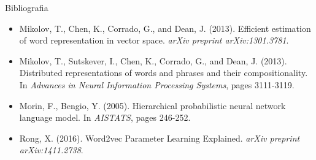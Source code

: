 \documentclass{beamer}
\begin{document}
\begin{frame}[fragile]{Bibliografia}

\begin{itemize}
\item Mikolov, T., Chen, K., Corrado, G., and Dean, J. (2013). Efficient estimation of word representation in vector space. \textit{arXiv preprint arXiv:1301.3781}.
\item Mikolov, T., Sutskever, I., Chen, K., Corrado, G., and Dean, J. (2013). Distributed representations of words and phrases and their compositionality. In \textit{Advances in Neural Information Processing Systems}, pages 3111-3119.
\item Morin, F., Bengio, Y. (2005). Hierarchical probabilistic neural network language model. In \textit{AISTATS}, pages 246-252.
\item Rong, X. (2016). Word2vec Parameter Learning Explained. \textit{arXiv preprint arXiv:1411.2738}.


\end{itemize}

\end{frame}
\end{document}
